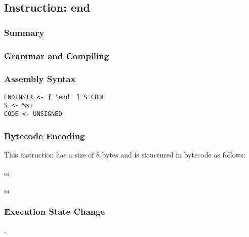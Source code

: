 \subsection{Instruction: end}

\subsubsection{Summary}


\subsubsection{Grammar and Compiling}


\subsubsection{Assembly Syntax}

\begin{myquote}
\begin{verbatim}
ENDINSTR <- { 'end' } S CODE
S <- %s+
CODE <- UNSIGNED
\end{verbatim}
\end{myquote}

\subsubsection{Bytecode Encoding}

This instruction has a size of 8 bytes and is structured in bytecode as follows:

$_{00}$\ 



$_{04}$\ 


\subsubsection{Execution State Change}

.


